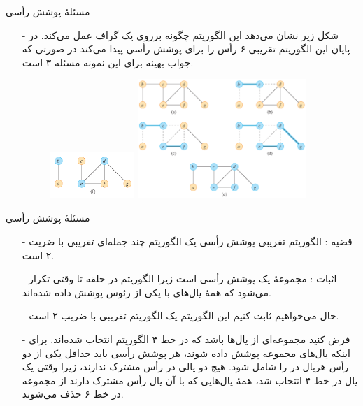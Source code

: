 \begin{frame}{‌مسئلهٔ پوشش رأسی}
\begin{itemize}\itemr
\item[-]
شکل زیر نشان می‌دهد این الگوریتم چگونه برروی یک گراف عمل می‌کند.
در پایان این الگوریتم تقریبی ۶ رأس را برای پوشش رأسی پیدا می‌کند در صورتی که جواب بهینه برای این نمونه مسئله ۳ است.
\begin{figure}
\includegraphics[width=0.3\textwidth]{figs/chap08/1108-vertex-cover-res}
\includegraphics[width=0.6\textwidth]{figs/chap08/1108-vertex-cover}
\end{figure}
\end{itemize}
\end{frame}


\begin{frame}{‌مسئلهٔ پوشش رأسی}
\begin{itemize}\itemr
\item[-]
قضیه : الگوریتم تقریبی پوشش رأسی یک الگوریتم چند جمله‌ای تقریبی با ضریت ۲ است.
\item[-]
اثبات : مجموعهٔ
یک پوشش رأسی است زیرا الگوریتم در حلقه تا وقتی تکرار می‌شود که همهٔ یال‌های
با یکی از رئوس
پوشش داده شده‌اند.
\item[-]
حال می‌خواهیم ثابت کنیم این الگوریتم یک الگوریتم تقریبی با ضریب ۲ است.
\item[-]
فرض کنید
مجموعه‌ای از یال‌ها باشد که در خط ۴ الگوریتم انتخاب شده‌اند. برای اینکه یال‌های مجموعه
پوشش داده شوند، هر پوشش رأسی باید حداقل یکی از دو رأس هریال در
را شامل شود. هیچ دو یالی در
رأس مشترک ندارند، زیرا وقتی یک یال در خط ۴ انتخاب شد، همهٔ یال‌هایی که با آن یال رأس مشترک دارند از مجموعه
در خط ۶ حذف می‌شوند.
\end{itemize}
\end{frame}


